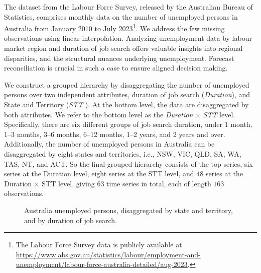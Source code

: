 \documentclass[
  11pt]{article}
\theoremstyle{plain}
\theoremstyle{remark}
\begin{document}
The dataset from the Labour Force Survey, released by the Australian
Bureau of Statistics, comprises monthly data on the number of unemployed
persons in Australia from January 2010 to July 2023\footnote{The Labour
  Force Survey data is publicly available at
  \url{https://www.abs.gov.au/statistics/labour/employment-and-unemployment/labour-force-australia-detailed/aug-2023}.}.
We address the few missing observations using linear interpolation.
Analyzing unemployment data by labour market region and duration of job
search offers valuable insights into regional disparities, and the
structural nuances underlying unemployment. Forecast reconciliation is
crucial in such a case to ensure aligned decision making.

We construct a grouped hierarchy by disaggregating the number of
unemployed persons over two independent attributes, duration of job
search (\emph{Duration}), and State and Territory (\emph{STT} ). At the
bottom level, the data are disaggregated by both attributes. We refer to
the bottom level as the \emph{Duration} \(\times\) \emph{STT} level.
Specifically, there are six different groups of job search duration,
under 1 month, 1--3 months, 3--6 months, 6--12 months, 1--2 years, and 2
years and over. Additionally, the number of unemployed persons in
Australia can be disaggregated by eight states and territories, i.e.,
NSW, VIC, QLD, SA, WA, TAS, NT, and ACT. So the final grouped hierarchy
consists of the top series, six series at the Duration level, eight
series at the STT level, and \(48\) series at the Duration \(\times\)
STT level, giving \(63\) time series in total, each of length \(163\)
observations.

\begin{figure}[!t]


\caption{\label{fig-labour-data}Australia unemployed persons,
disaggregated by state and territory, and by duration of job search.}

\end{figure}%
\end{document}
